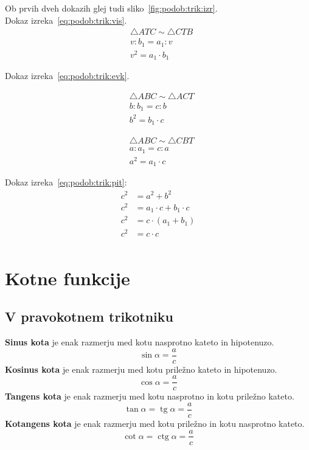 \documentclass[a4paper,oneside,12pt,fleqn]{article}
\newcommand\krat\cdot
\newcommand{\tg}{\ensuremath{\operatorname{tg}}} %
\newcommand{\ctg}{\ensuremath{\operatorname{ctg}}} %
\numberwithin{equation}{section}
\begin{document}
Ob prvih dveh dokazih glej tudi sliko~\ref{fig:podob:trik:izr}.\\
Dokaz izreka~\eqref{eq:podob:trik:vis}.
\begin{align*}
  &\triangle ATC \sim \triangle CTB \\
  & v : b_1 = a_1 : v \\
  & v^2 = a_1\krat b_1
\end{align*}

Dokaz izreka~\eqref{eq:podob:trik:evk}.\\[-16pt]
\parbox[t]{0.5\textwidth}{
\begin{align*}
  &\triangle ABC \sim \triangle ACT \\
  & b : b_1 = c : b \\
  & b^2 = b_1\krat c
\end{align*}
}
\parbox[t]{0.5\textwidth}{
\begin{align*}
  &\triangle ABC \sim \triangle CBT \\
  & a : a_1 = c : a \\
  & a^2 = a_1\krat c
\end{align*}
}

Dokaz izreka~\eqref{eq:podob:trik:pit}:
\begin{align*}
  c^2 &= a^2 + b^2 \\
  c^2 &= a_1 \krat c + b_1 \krat c \\
  c^2 &= c \krat (a_1 + b_1) \\
  c^2 &= c \krat c \\
\end{align*}



\section{Kotne funkcije}
\label{sec:kot}

\subsection{V pravokotnem trikotniku}
\label{sec:kot:prav}
\textbf{Sinus kota} je enak razmerju med kotu nasprotno kateto in hipotenuzo.
\[ \sin\alpha = \frac{a}{c} \]
\textbf{Kosinus kota} je enak razmerju med kotu priležno kateto in hipotenuzo.
\[ \cos\alpha = \frac{a}{c} \]
\textbf{Tangens kota} je enak razmerju med kotu nasprotno in kotu priležno kateto.
\[ \tan\alpha = \tg\alpha = \frac{a}{c} \]
\textbf{Kotangens kota} je enak razmerju med kotu priležno in kotu nasprotno kateto.
\[ \cot\alpha = \ctg\alpha = \frac{a}{c} \]
\end{document}
